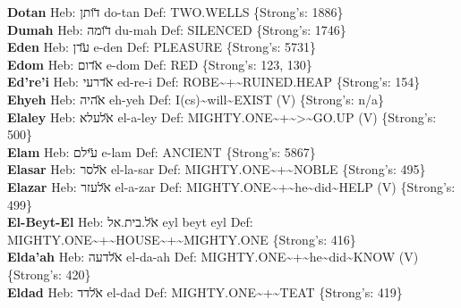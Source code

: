 {\textbf{Dotan} Heb: {\large\H דותן} do-tan Def: TWO.WELLS \{Strong's: 1886\}\hfill{}\\

\textbf{Dumah} Heb: {\large\H דומה} du-mah Def: SILENCED \{Strong's: 1746\}\hfill{}\\

\textbf{Eden} Heb: {\large\H עדן} e-den Def: PLEASURE \{Strong's: 5731\}\hfill{}\\

\textbf{Edom} Heb: {\large\H אדום} e-dom Def: RED \{Strong's: 123, 130\}\hfill{}\\

\textbf{Ed're'i} Heb: {\large\H אדרעי} ed-re-i Def: ROBE\textasciitilde{}+\textasciitilde{}RUINED.HEAP \{Strong's: 154\}\hfill{}\\

\textbf{Ehyeh} Heb: {\large\H אהיה} eh-yeh Def: I(cs)\textasciitilde{}will\textasciitilde{}EXIST (V) \{Strong's: n/a\}\hfill{}\\

\textbf{Elaley} Heb: {\large\H אלעלא} el-a-ley Def: MIGHTY.ONE\textasciitilde{}+\textasciitilde{}>\textasciitilde{}GO.UP (V) \{Strong's: 500\}\hfill{}\\

\textbf{Elam} Heb: {\large\H עילם} e-lam Def: ANCIENT \{Strong's: 5867\}\hfill{}\\

\textbf{Elasar} Heb: {\large\H אלסר} el-la-sar Def: MIGHTY.ONE\textasciitilde{}+\textasciitilde{}NOBLE \{Strong's: 495\}\hfill{}\\

\textbf{Elazar} Heb: {\large\H אלעזר} el-a-zar Def: MIGHTY.ONE\textasciitilde{}+\textasciitilde{}he\textasciitilde{}did\textasciitilde{}HELP (V) \{Strong's: 499\}\hfill{}\\

\textbf{El-Beyt-El} Heb: {\large\H אל.בית.אל} eyl beyt eyl Def: MIGHTY.ONE\textasciitilde{}+\textasciitilde{}HOUSE\textasciitilde{}+\textasciitilde{}MIGHTY.ONE \{Strong's: 416\}\hfill{}\\

\textbf{Elda'ah} Heb: {\large\H אלדעה} el-da-ah Def: MIGHTY.ONE\textasciitilde{}+\textasciitilde{}he\textasciitilde{}did\textasciitilde{}KNOW (V) \{Strong's: 420\}\hfill{}\\

\textbf{Eldad} Heb: {\large\H אלדד} el-dad Def: MIGHTY.ONE\textasciitilde{}+\textasciitilde{}TEAT \{Strong's: 419\}\hfill{}\\

}
